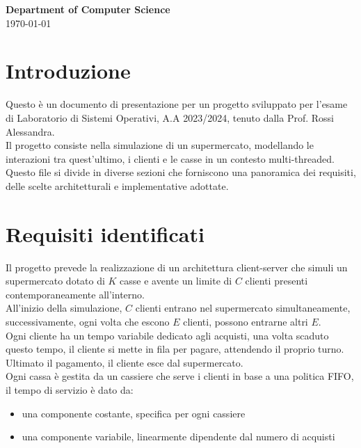 \documentclass[a4paper, 12pt]{article}
\begin{document}
\begin{titlepage}
    \vspace{2in}

    \textbf{\large Department of Computer Science} \\

    \today

\end{titlepage}

\newpage

\section{Introduzione}
Questo è un documento di presentazione per un progetto sviluppato per l'esame di Laboratorio di 
Sistemi Operativi, A.A 2023/2024, tenuto dalla Prof. Rossi Alessandra.  \\
Il progetto consiste nella simulazione di un supermercato, modellando le 
interazioni tra quest'ultimo, i clienti e le casse in un contesto multi-threaded. 
Questo file si divide in diverse sezioni che forniscono una panoramica dei 
requisiti, delle scelte architetturali e implementative adottate.
\section{Requisiti identificati}
Il progetto prevede la realizzazione di un architettura client-server che simuli 
un supermercato dotato di $K$ casse e avente un limite di $C$ clienti presenti 
contemporaneamente all'interno. \\
All'inizio della simulazione, $C$ clienti entrano nel supermercato 
simultaneamente, successivamente, ogni volta che escono $E$ clienti, possono 
entrarne altri $E$. \\
Ogni cliente ha un tempo variabile dedicato agli acquisti, una volta scaduto questo
tempo, il cliente si mette in fila per pagare, attendendo il proprio turno.
Ultimato il pagamento, il cliente esce dal supermercato. \\
Ogni cassa è gestita da un cassiere che serve i clienti in base a una politica FIFO,
il tempo di servizio è dato da:
\begin{itemize}[noitemsep,topsep=0pt,parsep=0pt,partopsep=0pt]
    \item una componente costante, specifica per ogni cassiere
    \item una componente variabile, linearmente dipendente dal numero di acquisti
\end{itemize}
\end{document}
